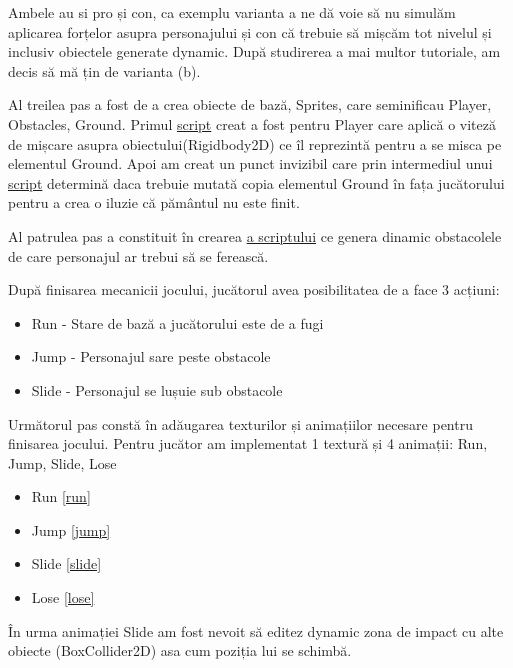 Ambele au si pro și con, ca exemplu varianta a ne dă voie să nu simulăm aplicarea forțelor asupra personajului și con că trebuie să mișcăm tot nivelul și inclusiv obiectele generate dynamic. După studirerea a mai multor tutoriale\cite{endless-runner-force}, am decis să mă țin de varianta (b). 

Al treilea pas a fost de a crea obiecte de bază, Sprites, care seminificau Player, Obstacles, Ground. Primul \href{https://github.com/AScripnic/MIDPS-laboratories/blob/master/Lab%234/Running%20Man/Assets/PlayerBehaivor.cs}{script}\cite{scripting} creat a fost pentru Player care aplică o viteză de mișcare asupra obiectului(Rigidbody2D) ce îl reprezintă pentru a se misca pe elementul Ground. Apoi am creat un punct invizibil care prin intermediul unui \href{https://github.com/AScripnic/MIDPS-laboratories/blob/master/Lab%234/Running%20Man/Assets/GroundGenerator.cs}{script} determină daca trebuie mutată copia elementul\cite{instantiate} Ground în fața jucătorului pentru a crea o iluzie că pământul nu este finit.

Al patrulea pas a constituit în crearea \href{https://github.com/AScripnic/MIDPS-laboratories/blob/master/Lab%234/Running%20Man/Assets/ObstaclesGenerator.cs}{a scriptului} ce genera dinamic obstacolele de care personajul ar trebui să se ferească.

După finisarea mecanicii jocului, jucătorul avea posibilitatea de a face 3 acțiuni:
\begin{itemize}
	\item Run - Stare de bază a jucătorului este de a fugi
	\item Jump - Personajul sare peste obstacole
	\item Slide - Personajul se lușuie sub obstacole
\end{itemize}

Următorul pas constă în adăugarea texturilor și animațiilor necesare pentru finisarea jocului. Pentru jucător am implementat 1 textură și 4 animații\cite{animation}: Run, Jump, Slide, Lose
\begin{itemize}
	\item Run \ref{run}
	\item Jump \ref{jump}
	\item Slide \ref{slide}
	\item Lose \ref{lose}
\end{itemize}

În urma animației Slide am fost nevoit să editez dynamic zona de impact cu alte obiecte (BoxCollider2D) asa cum poziția lui se schimbă.

